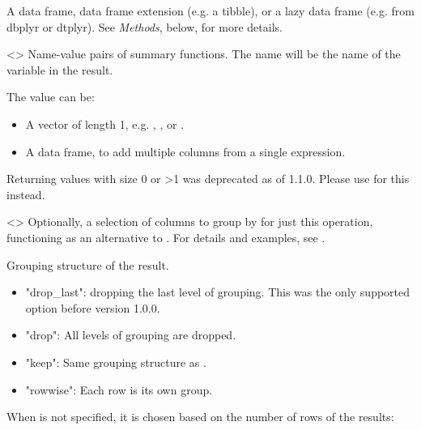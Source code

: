 \documentclass[a4paper]{book}
\begin{document}
\begin{Arguments}
\begin{ldescription}
\item[\code{.data}] A data frame, data frame extension (e.g. a tibble), or a
lazy data frame (e.g. from dbplyr or dtplyr). See \emph{Methods}, below, for
more details.

\item[\code{...}] <> Name-value pairs of
summary functions. The name will be the name of the variable in the result.

The value can be:
\begin{itemize}

\item{} A vector of length 1, e.g. , , or .
\item{} A data frame, to add multiple columns from a single expression.

\end{itemize}


\strong{[Deprecated]} Returning values with size 0 or >1 was
deprecated as of 1.1.0. Please use  for this instead.

\item[\code{.by}] \strong{[Experimental]}

<> Optionally, a selection of columns to
group by for just this operation, functioning as an alternative to . For
details and examples, see .

\item[\code{.groups}] \strong{[Experimental]} Grouping structure of the
result.
\begin{itemize}

\item{} "drop\_last": dropping the last level of grouping. This was the
only supported option before version 1.0.0.
\item{} "drop": All levels of grouping are dropped.
\item{} "keep": Same grouping structure as .
\item{} "rowwise": Each row is its own group.

\end{itemize}


When  is not specified, it is chosen
based on the number of rows of the results:
\begin{itemize}


\end{itemize}
\end{ldescription}
\end{Arguments}
\end{document}
